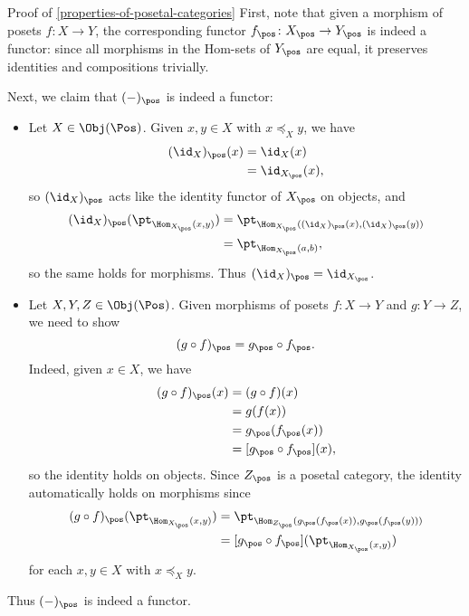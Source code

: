 \begin{Proof}{Proof of \cref{properties-of-posetal-categories}}%
    First, note that given a morphism of posets $f\colon X\to Y$, the corresponding functor $f_{\pos}\colon X_{\pos}\to Y_{\pos}$ is indeed a functor: since all morphisms in the Hom-sets of $Y_{\pos}$ are equal, it preserves identities and compositions trivially.

    \indent Next, we claim that $(-)_{\pos}$ is indeed a functor:
    \begin{itemize}
        \item{}Let $X\in\Obj(\Pos)$. Given $x,y\in X$ with $x\preceq_{X}y$, we have
            \begin{align*}
                (\id_{X})_{\pos}(x) &= \id_{X}(x)\\
                                    &= \id_{X_{\pos}}(x),
            \end{align*}
            so $(\id_{X})_{\pos}$ acts like the identity functor of $X_{\pos}$ on objects, and
            \begin{align*}
                (\id_{X})_{\pos}(\pt_{\Hom_{X_{\pos}}(x,y)}) &= \pt_{\Hom_{X_{\pos}}((\id_{X})_{\pos}(x),(\id_{X})_{\pos}(y))}\\
                                                             &= \pt_{\Hom_{X_{\pos}}(a,b)},
            \end{align*}
            so the same holds for morphisms. Thus $(\id_{X})_{\pos}=\id_{X_{\pos}}$.
        \item{}Let $X,Y,Z\in\Obj(\Pos)$. Given morphisms of posets $f\colon X\to Y$ and $g\colon Y\to Z$, we need to show
            \[
                (g\circ f)_{\pos}%
                =%
                g_{\pos}\circ f_{\pos}.%
            \]%
            Indeed, given $x\in X$, we have
            \begin{align*}
                (g\circ f)_{\pos}(x) &= (g\circ f)(x)\\
                                     &= g(f(x))\\
                                     &= g_{\pos}(f_{\pos}(x))\\
                                     &= [g_{\pos}\circ f_{\pos}](x),
            \end{align*}
            so the identity holds on objects. Since $Z_{\pos}$ is a posetal category, the identity automatically holds on morphisms since
            \begin{align*}
                (g\circ f)_{\pos}(\pt_{\Hom_{X_{\pos}}(x,y)}) &= \pt_{\Hom_{Z_{\pos}}(g_{\pos}(f_{\pos}(x)),g_{\pos}(f_{\pos}(y)))}\\
                                                              &= [g_{\pos}\circ f_{\pos}](\pt_{\Hom_{X_{\pos}}(x,y)})
            \end{align*}
            for each $x,y\in X$ with $x\preceq_{X}y$.
    \end{itemize}
    Thus $(-)_{\pos}$ is indeed a functor.


\end{Proof}
